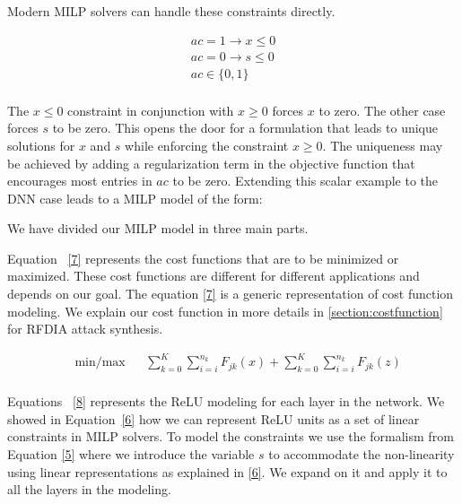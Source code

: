 Modern MILP solvers can handle these constraints directly.

\begin{equation}
\label{6}
\begin{aligned}
ac =  1 \rightarrow x \leq 0  \\
ac =  0 \rightarrow s \leq 0  \\
ac \in \{0,1\} \\
\end{aligned}
\end{equation}

The $x \leq 0$ constraint in conjunction with $x \geq 0$ forces $x$ to zero. The other case forces $s$ to be zero.
This opens the door for a formulation that leads to unique solutions for $x$ and $s$ while enforcing the constraint $x \geq 0$.
The uniqueness may be achieved by adding a regularization term in the objective function that encourages most entries in $ac$ to be zero.
Extending this scalar example to the DNN case leads to a \ac{MILP} model of the form:


We have divided our \ac{MILP} model in three main parts. 





Equation ~\ref{7} represents the cost functions that are to be minimized or maximized.
These cost functions are different for different applications and depends on our goal. 
The equation \ref{7} is a generic representation of cost function modeling. 
We explain our cost function in more details in \ref{section:costfunction} for \ac{RFDIA} attack synthesis. 

\begin{equation}
\label{7}
\begin{aligned}
& \underset{}{\text{min/max}}
& &  \sum_{k=0}^{K} \sum_{i=i}^{n_k}F_{jk}(x)   + \sum_{k=0}^{K} \sum_{i=i}^{n_k}F_{jk}(z)  \\
\end{aligned}
\end{equation}


Equations ~\ref{8} represents the ReLU modeling for each layer in the network. 
We showed in Equation~\ref{6} how we can represent ReLU units as a set of linear constraints in \ac{MILP} solvers. 
To model the constraints we use the formalism from Equation \ref{5} where we introduce the variable $s$ to accommodate the non-linearity using linear representations as explained in \ref{6}. 
We expand on it and apply it to all the layers in the modeling. 
 
